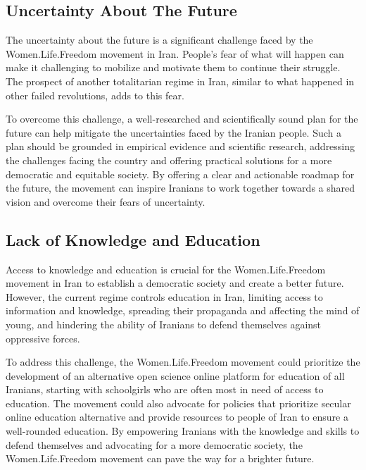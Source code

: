 \documentclass{IEEEtran}
\begin{document}
\subsection{Uncertainty About The Future}
The uncertainty about the future is a significant challenge faced by the Women.Life.Freedom movement in Iran. 
People's fear of what will happen can make it challenging to mobilize and motivate them to continue their struggle.
The prospect of another totalitarian regime in Iran, similar to what happened in other failed revolutions, adds to this fear.

To overcome this challenge, a well-researched and scientifically sound plan for the future can help mitigate the uncertainties faced by the Iranian people. Such a plan should be grounded in empirical evidence and scientific research, addressing the challenges facing the country and offering practical solutions for a more democratic and equitable society. By offering a clear and actionable roadmap for the future, the movement can inspire Iranians to work together towards a shared vision and overcome their fears of uncertainty.

\subsection{Lack of Knowledge and Education}

Access to knowledge and education is crucial for the Women.Life.Freedom movement in Iran to establish a democratic society and create a better future. However, the current regime controls education in Iran, limiting access to information and knowledge, spreading their propaganda and affecting the mind of young, and hindering the ability of Iranians to defend themselves against oppressive forces.

To address this challenge, the Women.Life.Freedom movement could prioritize the development of an alternative open science online platform for education of all Iranians, starting with schoolgirls who are often most in need of access to education. The movement could also advocate for policies that prioritize secular online education alternative and provide resources to people of Iran to ensure a well-rounded education.
By empowering Iranians with the knowledge and skills to defend themselves and advocating for a more democratic society, the Women.Life.Freedom movement can pave the way for a brighter future.
\end{document}
